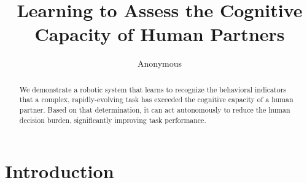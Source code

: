 \documentclass{sig-alternate}
\begin{document}
\title{Learning to Assess the Cognitive Capacity of Human Partners}


\author{
%
\alignauthor
Anonymous\\
}

\maketitle 

\begin{abstract}  We demonstrate a robotic system that learns to recognize the behavioral indicators that a complex,
rapidly-evolving task has exceeded the cognitive capacity of a human partner.  Based on that determination, it can act
autonomously to reduce the human decision burden, significantly improving task performance. \end{abstract}




\section{Introduction}
\end{document}
